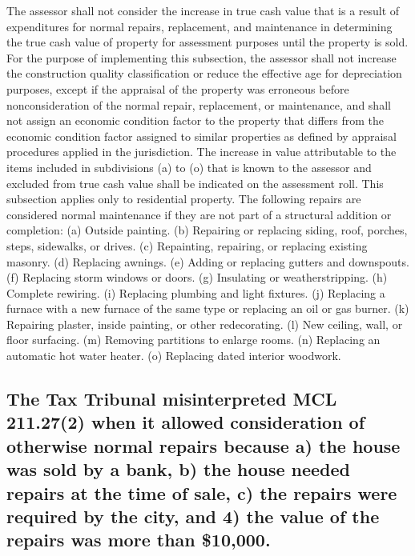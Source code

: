 The assessor shall not consider the increase in true cash value that is a result of expenditures for normal repairs, replacement, and maintenance in determining the true cash value of property for assessment purposes until the property is sold. For the purpose of implementing this subsection, the assessor shall not increase the construction quality classification or reduce the effective age for depreciation purposes, except if the appraisal of the property was erroneous before nonconsideration of the normal repair, replacement, or maintenance, and shall not assign an economic condition factor to the property that differs from the economic condition factor assigned to similar properties as defined by appraisal procedures applied in the jurisdiction. The increase in value attributable to the items included in subdivisions (a) to (o) that is known to the assessor and excluded from true cash value shall be indicated on the assessment roll. This subsection applies only to residential property. The following repairs are considered normal maintenance if they are not part of a structural addition or completion:
(a) Outside painting. (b) Repairing or replacing siding, roof, porches, steps, sidewalks, or drives. (c) Repainting, repairing, or replacing existing masonry. (d) Replacing awnings. (e) Adding or replacing gutters and downspouts. (f) Replacing storm windows or doors. (g) Insulating or weatherstripping. (h) Complete rewiring. (i) Replacing plumbing and light fixtures. (j) Replacing a furnace with a new furnace of the same type or replacing an oil or gas burner. (k) Repairing plaster, inside painting, or other redecorating. (l) New ceiling, wall, or floor surfacing. (m) Removing partitions to enlarge rooms. (n) Replacing an automatic hot water heater. (o) Replacing dated interior woodwork.
 
\subsection{The Tax Tribunal misinterpreted MCL 211.27(2) when it allowed consideration of otherwise normal repairs because a) the house was sold by a bank, b) the house needed repairs at the time of sale, c) the repairs were required by the city, and 4) the value of the repairs was more than \$10,000.}
 
